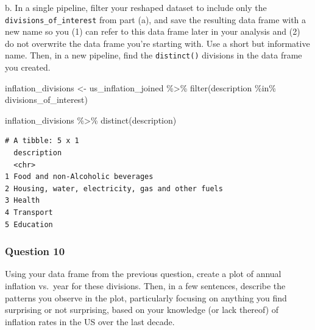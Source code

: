 \documentclass[
  letterpaper,
  DIV=11,
  numbers=noendperiod]{scrartcl}
\newenvironment{Shaded}{\begin{snugshade}}{\end{snugshade}}
\newcommand{\FunctionTok}[1]{\textcolor[rgb]{0.28,0.35,0.67}{#1}}
\newcommand{\NormalTok}[1]{\textcolor[rgb]{0.00,0.23,0.31}{#1}}
\newcommand{\OtherTok}[1]{\textcolor[rgb]{0.00,0.23,0.31}{#1}}
\newcommand{\SpecialCharTok}[1]{\textcolor[rgb]{0.37,0.37,0.37}{#1}}
\begin{document}
b. In a single pipeline, filter your reshaped dataset to include only
the \texttt{divisions\_of\_interest} from part (a), and save the
resulting data frame with a new name so you (1) can refer to this data
frame later in your analysis and (2) do not overwrite the data frame
you're starting with. Use a short but informative name. Then, in a new
pipeline, find the \texttt{distinct()} divisions in the data frame you
created.

\begin{Shaded}
\begin{Highlighting}[]
\NormalTok{inflation\_divisions }\OtherTok{\textless{}{-}}\NormalTok{ us\_inflation\_joined }\SpecialCharTok{\%\textgreater{}\%}
  \FunctionTok{filter}\NormalTok{(description }\SpecialCharTok{\%in\%}\NormalTok{ divisions\_of\_interest)}

\NormalTok{inflation\_divisions }\SpecialCharTok{\%\textgreater{}\%}
  \FunctionTok{distinct}\NormalTok{(description)}
\end{Highlighting}
\end{Shaded}

\begin{verbatim}
# A tibble: 5 x 1
  description                                     
  <chr>                                           
1 Food and non-Alcoholic beverages                
2 Housing, water, electricity, gas and other fuels
3 Health                                          
4 Transport                                       
5 Education                                       
\end{verbatim}

\subsubsection{Question 10}\label{question-10}

Using your data frame from the previous question, create a plot of
annual inflation vs.~year for these divisions. Then, in a few sentences,
describe the patterns you observe in the plot, particularly focusing on
anything you find surprising or not surprising, based on your knowledge
(or lack thereof) of inflation rates in the US over the last decade.
\end{document}
